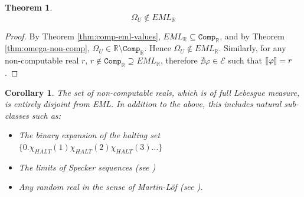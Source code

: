 \documentclass[a4paper,10pt]{article}
\newtheorem{theorem}{Theorem}
\newtheorem{corollary}{Corollary}
\newcommand{\rrbracket}{\right]\hspace{-0.15em}\right]}
\newcommand{\llbracket}{\left[\hspace{-0.15em}\left[}
\newcommand{\interpret}[1]{\llbracket #1 \rrbracket}
\begin{document}
\begin{theorem}\label{thm:main}
$$\Omega_U \notin EML_\mathbb{R}$$
\end{theorem}
\begin{proof}
    By Theorem \ref{thm:comp-eml-values}, $EML_\mathbb{R} \subseteq \mathtt{Comp}_\mathbb{R}$, and by Theorem \ref{thm:omega-non-comp}, $\Omega_U \in \mathbb{R} \setminus \mathtt{Comp}_\mathbb{R}$. Hence $\Omega_U \notin EML_\mathbb{R}$. Similarly, for any non-computable real $r$, $r\notin \mathtt{Comp}_\mathbb{R} \supseteq EML_\mathbb{R}$, therefore $\nexists \varphi \in \mathcal{E}$ such that $\interpret{\varphi} = r$.
\end{proof}
    
\begin{corollary}
    The set of non-computable reals, which is of full Lebesgue measure, is entirely disjoint from EML. In addition to the above, this includes natural sub-classes such as:

    \begin{itemize}
        \item The binary expansion of the halting set $\{ 0.\chi_{HALT}(1)\chi_{HALT}(2)\chi_{HALT}(3)\ldots \}$
        \item The limits of Specker sequences (see \cite{Weihrauch2000})
        \item Any random real in the sense of Martin-L\"of (see \cite{Downey2010-wc}).
    \end{itemize}
\end{corollary}



\end{document}
